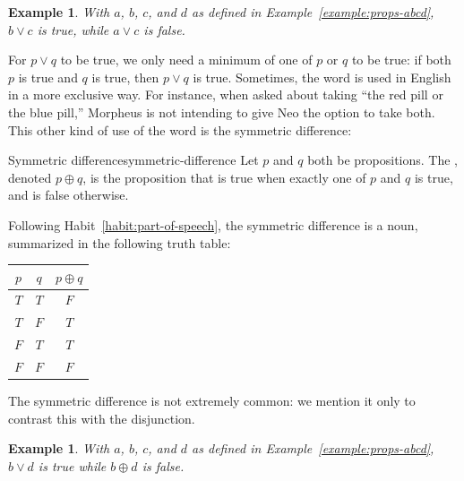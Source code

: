 \documentclass{book}
\newcounter{ekcounter}%
\theoremstyle{ekimcustom}
\newtheorem{example}[ekcounter]{Example}
\newcommand\defn[1]{{\color{blue}{\bf #1}}}
\begin{document}
\begin{example}
With $a$, $b$, $c$, and $d$ as defined in Example~\ref{example:props-abcd}, $b \vee c$ is true, while $a \vee c$ is false.
\end{example}

For $p \vee q$ to be true, we only need a minimum of one of $p$ or $q$ to be true: if both $p$ is true and $q$ is true, then $p \vee q$ is true. Sometimes, the word  is used in English in a more exclusive way. For instance, when asked about taking ``the red pill or the blue pill,'' Morpheus is not intending to give Neo the option to take both. This other kind of use of the word  is the symmetric difference:
\begin{bdefinition}{Symmetric difference}{symmetric-difference}
Let $p$ and $q$ both be propositions. The \defn{symmetric difference}, denoted $p \oplus q$, is the proposition that is true when exactly one of $p$ and $q$ is true, and is false otherwise.
\end{bdefinition}
Following Habit~\ref{habit:part-of-speech}, the symmetric difference is a noun, summarized in the following truth table:
\begin{center}
\begin{tabular}{c|c||c}
$p$ & $q$ & $p \oplus q$ \\\hline
$T$ & $T$ & $F$\\
$T$ & $F$ & $T$\\
$F$ & $T$ & $T$\\
$F$ & $F$ & $F$
\end{tabular}
\end{center}
The symmetric difference is not extremely common: we mention it only to contrast this with the disjunction.
\begin{example}
With $a$, $b$, $c$, and $d$ as defined in Example~\ref{example:props-abcd}, $b \vee d$ is true while $b \oplus d$ is false.
\end{example}
\end{document}
